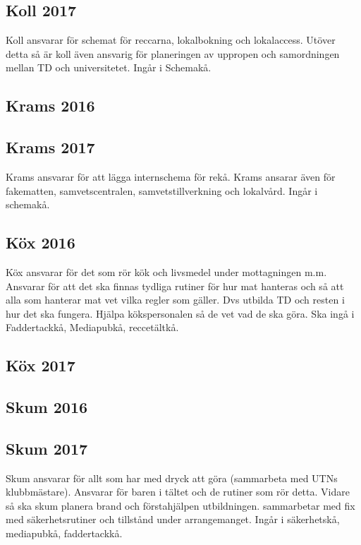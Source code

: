 \documentclass[a4paper]{article}
\begin{document}
\subsection{Koll 2017}

Koll ansvarar för schemat för reccarna, lokalbokning 
och lokalaccess. Utöver detta så är koll även ansvarig 
för planeringen av uppropen och samordningen mellan TD 
och universitetet. Ingår i Schemakå.

\subsection{Krams 2016}



\subsection{Krams 2017}

Krams ansvarar för att lägga internschema för rekå. 
Krams ansarar även för fakematten, samvetscentralen, 
samvetstillverkning och lokalvård. Ingår i schemakå.

\subsection{Köx 2016}

Köx ansvarar för det som rör kök och livsmedel under 
mottagningen m.m. Ansvarar för att det ska finnas 
tydliga rutiner för hur mat hanteras och så att alla 
som hanterar mat vet vilka regler som gäller. Dvs 
utbilda TD och resten i hur det ska fungera. Hjälpa 
kökspersonalen så de vet vad de ska göra. Ska ingå i 
Faddertackkå, Mediapubkå, reccetältkå. 

\subsection{Köx 2017}



\subsection{Skum 2016}



\subsection{Skum 2017}

Skum ansvarar för allt som har med dryck att göra 
(sammarbeta med UTNs klubbmästare). Ansvarar för baren 
i tältet och de rutiner som rör detta. Vidare så ska 
skum planera brand och förstahjälpen utbildningen. 
sammarbetar med fix med säkerhetsrutiner och tillstånd 
under arrangemanget. Ingår i säkerhetskå, mediapubkå, 
faddertackkå. 
\end{document}
